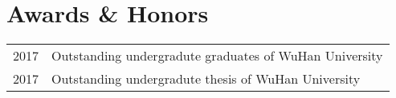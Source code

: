 \section*{Awards \& Honors}

\begin{tabular}{p{} p{}}
2017 & Outstanding undergradute graduates of WuHan University \\
2017 & Outstanding undergradute thesis of WuHan University \\
\end{tabular}

